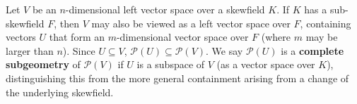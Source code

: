 Let $V$ be an $n$-dimensional left vector space over a skewfield $K$. If $K$ has a sub-skewfield $F$, then $V$ may also be viewed as a left vector space over $F$, containing vectors $U$ that form an $m$-dimensional vector space over $F$ (where $m$ may be larger than $n$). Since $U \subseteq V$, $\mathcal{P}(U) \subseteq \mathcal{P}(V)$. We say $\mathcal{P}(U)$ is a \textbf{complete subgeometry} of $\mathcal{P}(V)$ if $U$ is a subspace of $V$ (as a vector space over $K$), distinguishing this from the more general containment arising from a change of the underlying skewfield.
